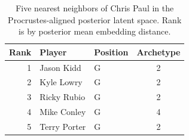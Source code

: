 \begin{table}[htbp]
  \centering\small
  \begin{tabular}{rllc}
    \toprule
    Rank & Player & Position & Archetype \\
    \midrule
    1 & Jason Kidd & G & 2 \\
    2 & Kyle Lowry & G & 2 \\
    3 & Ricky Rubio & G & 2 \\
    4 & Mike Conley & G & 4 \\
    5 & Terry Porter & G & 2 \\
    \bottomrule
  \end{tabular}
  \caption{Five nearest neighbors of Chris Paul in the Procrustes-aligned posterior latent space. Rank is by posterior mean embedding distance.}
  \label{tab:Chris_Paul_neighbors}
\end{table}

